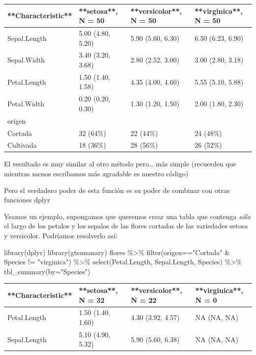 \documentclass[
]{book}
\newenvironment{Shaded}{\begin{snugshade}}{\end{snugshade}}
\newcommand{\AttributeTok}[1]{\textcolor[rgb]{0.77,0.63,0.00}{#1}}
\newcommand{\FunctionTok}[1]{\textcolor[rgb]{0.00,0.00,0.00}{#1}}
\newcommand{\NormalTok}[1]{#1}
\newcommand{\SpecialCharTok}[1]{\textcolor[rgb]{0.00,0.00,0.00}{#1}}
\newcommand{\StringTok}[1]{\textcolor[rgb]{0.31,0.60,0.02}{#1}}
\begin{document}
\begin{tabular}{l|l|l|l}
\hline
**Characteristic** & **setosa**, N = 50 & **versicolor**, N = 50 & **virginica**, N = 50\\
\hline
Sepal.Length & 5.00 (4.80, 5.20) & 5.90 (5.60, 6.30) & 6.50 (6.23, 6.90)\\
\hline
Sepal.Width & 3.40 (3.20, 3.68) & 2.80 (2.52, 3.00) & 3.00 (2.80, 3.18)\\
\hline
Petal.Length & 1.50 (1.40, 1.58) & 4.35 (4.00, 4.60) & 5.55 (5.10, 5.88)\\
\hline
Petal.Width & 0.20 (0.20, 0.30) & 1.30 (1.20, 1.50) & 2.00 (1.80, 2.30)\\
\hline
origen &  &  & \\
\hline
Cortada & 32 (64\%) & 22 (44\%) & 24 (48\%)\\
\hline
Cultivada & 18 (36\%) & 28 (56\%) & 26 (52\%)\\
\hline
\end{tabular}

El resultado es muy similar al otro método pero\ldots{} más simple (recuerden que mientras menos escribamos más agradable es nuestro código)

Pero el verdadero poder de esta función es su poder de combinar con otras funciones dplyr

Veamos un ejemplo, supongamos que queremos crear una tabla que contenga \emph{sólo} el largo de los petalos y los sepalos de las flores cortadas de las variedades setosa y versicolor. Podríamos resolverlo así:

\begin{Shaded}
\begin{Highlighting}[]
\FunctionTok{library}\NormalTok{(dplyr)}
\FunctionTok{library}\NormalTok{(gtsummary)}
\NormalTok{flores }\SpecialCharTok{\%\textgreater{}\%} \FunctionTok{filter}\NormalTok{(origen}\SpecialCharTok{==}\StringTok{"Cortada"} \SpecialCharTok{\&}\NormalTok{ Species }\SpecialCharTok{!=} \StringTok{"virginica"}\NormalTok{) }\SpecialCharTok{\%\textgreater{}\%}
  \FunctionTok{select}\NormalTok{(Petal.Length, Sepal.Length, Species) }\SpecialCharTok{\%\textgreater{}\%}
  \FunctionTok{tbl\_summary}\NormalTok{(}\AttributeTok{by=}\StringTok{"Species"}\NormalTok{)}
\end{Highlighting}
\end{Shaded}

\begin{tabular}{l|l|l|l}
\hline
**Characteristic** & **setosa**, N = 32 & **versicolor**, N = 22 & **virginica**, N = 0\\
\hline
Petal.Length & 1.50 (1.40, 1.60) & 4.30 (3.92, 4.57) & NA (NA, NA)\\
\hline
Sepal.Length & 5.10 (4.90, 5.32) & 5.90 (5.60, 6.38) & NA (NA, NA)\\
\hline
\end{tabular}
\end{document}
